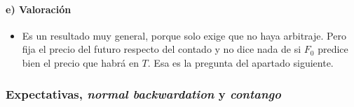 \documentclass[11pt]{article}
\begin{document}
\paragraph{e) Valoración}

\begin{itemize}
\item Es un resultado muy general, porque solo exige que no haya arbitraje. Pero fija el precio del futuro respecto del contado y no dice nada de si $F_0$ predice bien el precio que habrá en $T$. Esa es la pregunta del apartado siguiente.
\end{itemize}

\subsubsection{Expectativas, \emph{normal backwardation} y \emph{contango}}\label{sec:contango}
\end{document}
